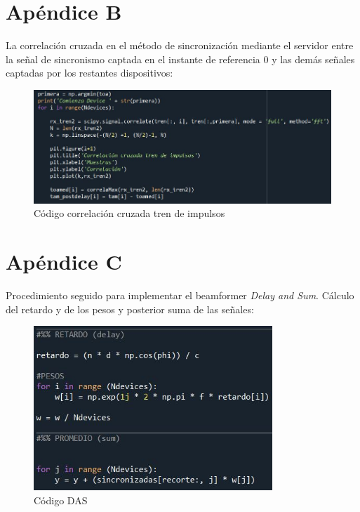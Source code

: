 \documentclass[a4paper,11pt]{book}
\begin{document}
\section{Apéndice B}
La correlación cruzada en el método de sincronización mediante el servidor entre la señal de sincronismo captada en el instante de referencia 0 y las demás señales captadas por los restantes dispositivos:
\begin{figure}[hbtp]
\centering
\includegraphics[width = 14cm]{FIGURAS/correla_TREN.JPG}
\caption{Código correlación cruzada tren de impulsos}
\end{figure}

\section{Apéndice C}
Procedimiento seguido para implementar el beamformer \textit{Delay and Sum}. Cálculo del retardo y de los pesos y posterior suma de las señales:
\begin{figure}[hbtp]
\centering
\includegraphics[width = 9cm]{FIGURAS/DAS_codigo.JPG}
\caption{Código DAS}
\end{figure}
\end{document}
